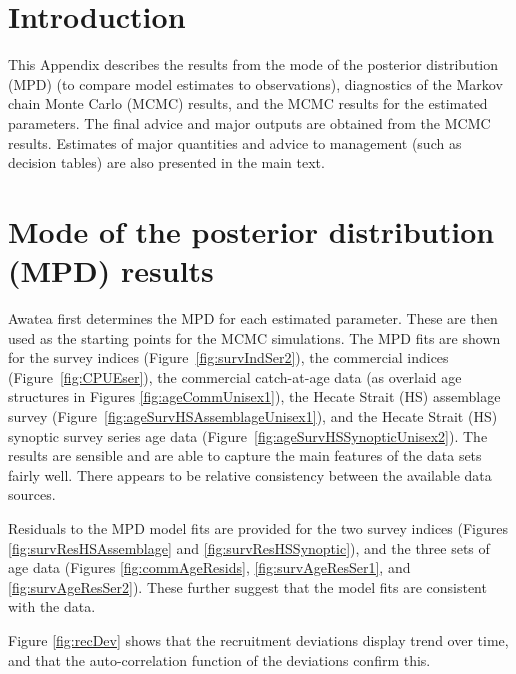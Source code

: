 
\section{Introduction}

This Appendix describes the results from the mode of the posterior distribution (MPD) (to compare model estimates to observations), diagnostics of the Markov chain Monte Carlo (MCMC) results, and the MCMC results for the estimated parameters.  The final advice and major outputs are obtained from the MCMC results. Estimates of major quantities and advice to management (such as decision tables) are also presented in the main text.


\section{Mode of the posterior distribution (MPD) results}

Awatea first determines the MPD for each estimated parameter.  These are then used as the starting points for the MCMC simulations. The MPD fits are shown for the survey indices (Figure~\ref{fig:survIndSer2}), the commercial indices (Figure~\ref{fig:CPUEser}), the commercial catch-at-age data (as overlaid age structures in Figures \ref{fig:ageCommUnisex1}), the Hecate Strait (HS) assemblage survey (Figure~\ref{fig:ageSurvHSAssemblageUnisex1}), and the Hecate Strait (HS) synoptic survey series age data (Figure~\ref{fig:ageSurvHSSynopticUnisex2}). The results are sensible and are able to capture the main features of the data sets fairly well. There appears to be relative consistency between the available data sources.

Residuals to the MPD model fits are provided for the two survey indices (Figures \ref{fig:survResHSAssemblage} and \ref{fig:survResHSSynoptic}), and the three sets of age data (Figures \ref{fig:commAgeResids}, \ref{fig:survAgeResSer1}, and \ref{fig:survAgeResSer2}). These further suggest that the model fits are consistent with the data.

Figure \ref{fig:recDev} shows that the recruitment deviations display trend over time, and that the auto-correlation function of the deviations confirm this.

